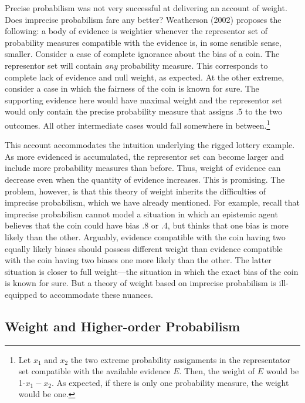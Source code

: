 \documentclass[
  10pt,
  dvipsnames,enabledeprecatedfontcommands]{scrartcl}
\begin{document}
Precise probabilism was not very successful at delivering an account of
weight. Does imprecise probabilism fare any better? Weatherson (2002)
proposes the following: a body of evidence is weightier whenever the
representor set of probability measures compatible with the evidence is,
in some sensible sense, smaller. Consider a case of complete ignorance
about the bias of a coin. The representor set will contain \emph{any}
probability measure. This corresponds to complete lack of evidence and
null weight, as expected. At the other extreme, consider a case in which
the fairness of the coin is known for sure. The supporting evidence here
would have maximal weight and the representor set would only contain the
precise probability measure that assigns .5 to the two outcomes. All
other intermediate cases would fall somewhere in between.\footnote{Let
  \(x_1\) and \(x_2\) the two extreme probability assignments in the
  representator set compatible with the available evidence \(E\). Then,
  the weight of \(E\) would be 1-\(x_1-x_2\). As expected, if there is
  only one probability measure, the weight would be one.}

This account accommodates the intuition underlying the rigged lottery
example. As more evidenced is accumulated, the representor set can
become larger and include more probability measures than before. Thus,
weight of evidence can decrease even when the quantity of evidence
increases. This is promising. The problem, however, is that this theory
of weight inherits the difficulties of imprecise probabilism, which we
have already mentioned. For example, recall that imprecise probabilism
cannot model a situation in which an epistemic agent believes that the
coin could have bias .8 or .4, but thinks that one bias is more likely
than the other. Arguably, evidence compatible with the coin having two
equally likely biases should possess different weight than evidence
compatible with the coin having two biases one more likely than the
other. The latter situation is closer to full weight---the situation in
which the exact bias of the coin is known for sure. But a theory of
weight based on imprecise probabilism is ill-equipped to accommodate
these nuances.

\hypertarget{weight-and-higher-order-probabilism}{%
\subsection{Weight and Higher-order
Probabilism}\label{weight-and-higher-order-probabilism}}
\end{document}
